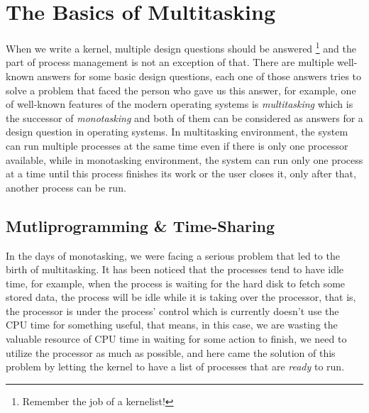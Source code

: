 \section{The Basics of Multitasking}\label{the-basics-of-multitasking}

When we write a kernel, multiple design questions should be answered
\footnote{Remember the job of a kernelist!} and the part of process
management is not an exception of that. There are multiple well-known
answers for some basic design questions, each one of those answers tries
to solve a problem that faced the person who gave us this answer, for
example, one of well-known features of the modern operating systems is
\emph{multitasking} which is the successor of \emph{monotasking} and
both of them can be considered as answers for a design question in
operating systems. In multitasking environment, the system can run
multiple processes at the same time even if there is only one processor
available, while in monotasking environment, the system can run only one
process at a time until this process finishes its work or the user
closes it, only after that, another process can be run.

\subsection{Mutliprogramming \&
Time-Sharing}\label{mutliprogramming-time-sharing}

In the days of monotasking, we were facing a serious problem that led to
the birth of multitasking. It has been noticed that the processes tend
to have idle time, for example, when the process is waiting for the hard
disk to fetch some stored data, the process will be idle while it is
taking over the processor, that is, the processor is under the process'
control which is currently doesn't use the CPU time for something
useful, that means, in this case, we are wasting the valuable resource
of CPU time in waiting for some action to finish, we need to utilize the
processor as much as possible, and here came the solution of this
problem by letting the kernel to have a list of processes that are
\emph{ready} to run.

